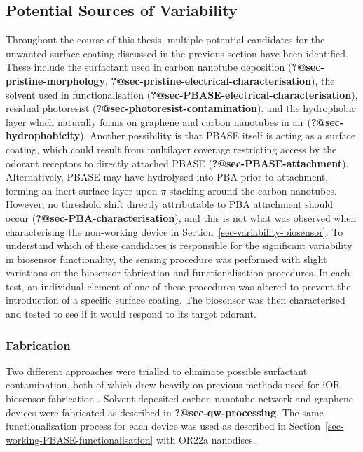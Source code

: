 \documentclass[
  a4paper,
]{scrbook}
\begin{document}
\hypertarget{sec-contamination}{%
\subsection{Potential Sources of Variability}\label{sec-contamination}}

Throughout the course of this thesis, multiple potential candidates for
the unwanted surface coating discussed in the previous section have been
identified. These include the surfactant used in carbon nanotube
deposition (\textbf{?@sec-pristine-morphology},
\textbf{?@sec-pristine-electrical-characterisation}), the solvent used
in functionalisation (\textbf{?@sec-PBASE-electrical-characterisation}),
residual photoresist (\textbf{?@sec-photoresist-contamination}), and the
hydrophobic layer which naturally forms on graphene and carbon nanotubes
in air (\textbf{?@sec-hydrophobicity}). Another possibility is that
PBASE itself is acting as a surface coating, which could result from
multilayer coverage restricting access by the odorant receptors to
directly attached PBASE (\textbf{?@sec-PBASE-attachment}).
Alternatively, PBASE may have hydrolysed into PBA prior to attachment,
forming an inert surface layer upon \(\pi\)-stacking around the carbon
nanotubes. However, no threshold shift directly attributable to PBA
attachment should occur (\textbf{?@sec-PBA-characterisation}), and this
is not what was observed when characterising the non-working device in
Section~\ref{sec-variability-biosensor}. To understand which of these
candidates is responsible for the significant variability in biosensor
functionality, the sensing procedure was performed with slight
variations on the biosensor fabrication and functionalisation
procedures. In each test, an individual element of one of these
procedures was altered to prevent the introduction of a specific surface
coating. The biosensor was then characterised and tested to see if it
would respond to its target odorant.

\hypertarget{fabrication}{%
\subsubsection*{Fabrication}\label{fabrication}}

Two different approaches were trialled to eliminate possible surfactant
contamination, both of which drew heavily on previous methods used for
iOR biosensor fabrication \autocite{Murugathas2019b,Murugathas2020}.
Solvent-deposited carbon nanotube network and graphene devices were
fabricated as described in \textbf{?@sec-qw-processing}. The same
functionalisation process for each device was used as described in
Section~\ref{sec-working-PBASE-functionalisation} with OR22a nanodiscs.
\end{document}
